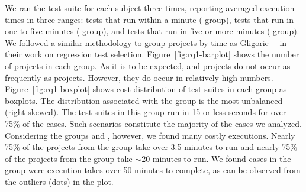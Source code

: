 


We ran the test suite for each subject three times, reporting averaged
execution times in three ranges: tests that run within a minute
(\shortg{} group), tests that run in one to five minutes (\medg{}
group), and tests that run in five or more minutes (\longg{}
group). We followed a similar methodology to group projects by time as
Gligoric~\etal{}~\cite{gligoric-etal-issta2015} in their work on
regression test selection. Figure~\ref{fig:rq1-barplot} shows the number of projects in
each group.  As it is to be expected, \longg{} and \medg{} projects do
not occur as frequently as \shortg{} projects.  However, they do occur
in relatively high numbers.  Figure~\ref{fig:rq1-boxplot} shows cost
distribution of test suites in each group as boxplots.  The
distribution associated with the \shortg{} group is the most
unbalanced (right skewed).  The test suites in this group run in 15 or less seconds for
over 75\% of the cases.  Such scenarios constitute the majority of the
cases we analyzed.  Considering the groups \medg{} and \longg{},
however, we found many costly executions.  Nearly 75\% of the projects
from the \medg{} group take over 3.5 minutes to run and nearly 75\% of
the projects from the \longg{} group take $\sim$20 minutes to run.  We
found cases in the \longg{} group were execution takes over 50 minutes
to complete, as can be observed from the outliers (dots) in the plot.




